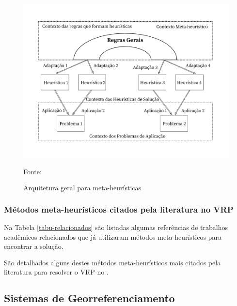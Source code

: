 \begin{figure}[H]
  \centering
  \caption{Arquitetura geral para meta-heurísticas}
 \includegraphics[scale=0.4]{imagens/metaheuristica.png} \par
\bigskip
\label{heuristica-goldbarg}
    Fonte: \cite[p. 75]{goldbarg}
\end{figure}

\subsubsection{Métodos meta-heurísticos citados pela literatura no VRP} \par
Na Tabela \ref{tabu-relacionados} são listadas algumas referências de trabalhos acadêmicos relacionados que já utilizaram métodos meta-heurísticos para encontrar a solução.



São detalhados alguns destes métodos meta-heurísticos mais citados pela literatura para resolver o VRP no .


\subsection{Sistemas de Georreferenciamento}\label{georreferenciamento}


